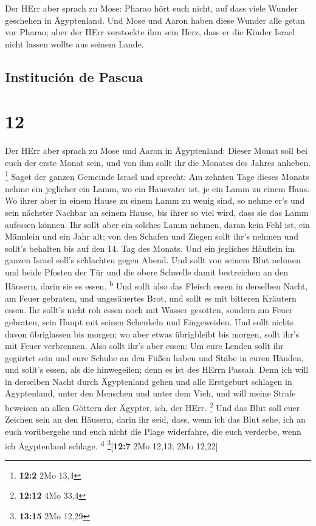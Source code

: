  Der HErr aber sprach zu Mose: Pharao hört euch nicht, auf
dass viele Wunder geschehen in Ägyptenland.  Und Mose und
Aaron haben diese Wunder alle getan vor Pharao; aber der HErr verstockte
ihm sein Herz, dass er die Kinder Israel nicht lassen wollte aus seinem
Lande.

\hypertarget{instituciuxf3n-de-pascua}{%
\subsection{Institución de Pascua}\label{instituciuxf3n-de-pascua}}

\hypertarget{section-11}{%
\section{12}\label{section-11}}

 Der HErr aber sprach zu Mose und Aaron in Ägyptenland:
 Dieser Monat soll bei euch der erste Monat sein, und von
ihm sollt ihr die Monates des Jahres anheben. \footnote{\textbf{12:2}
  2Mo 13,4}  Saget der ganzen Gemeinde Israel und sprecht:
Am zehnten Tage dieses Monats nehme ein jeglicher ein Lamm, wo ein
Hausvater ist, je ein Lamm zu einem Haus.  Wo ihrer aber
in einem Hause zu einem Lamm zu wenig sind, so nehme er's und sein
nächster Nachbar an seinem Hause, bis ihrer so viel wird, dass sie das
Lamm aufessen können.  Ihr sollt aber ein solches Lamm
nehmen, daran kein Fehl ist, ein Männlein und ein Jahr alt; von den
Schafen und Ziegen sollt ihr's nehmen  und sollt's
behalten bis auf den 14. Tag des Monats. Und ein jegliches Häuflein im
ganzen Israel soll's schlachten gegen Abend.  Und sollt
von seinem Blut nehmen und beide Pfosten der Tür und die obere Schwelle
damit bestreichen an den Häusern, darin sie es essen.
\textsuperscript{b}  Und sollt also das Fleisch essen in
derselben Nacht, am Feuer gebraten, und ungesäuertes Brot, und sollt es
mit bitteren Kräutern essen.  Ihr sollt's nicht roh essen
noch mit Wasser gesotten, sondern am Feuer gebraten, sein Haupt mit
seinen Schenkeln und Eingeweiden.  Und sollt nichts davon
übriglassen bis morgen; wo aber etwas übrigbleibt bis morgen, sollt
ihr's mit Feuer verbrennen.  Also sollt ihr's aber essen:
Um eure Lenden sollt ihr gegürtet sein und eure Schuhe an den Füßen
haben und Stäbe in euren Händen, und sollt's essen, als die hinwegeilen;
denn es ist des HErrn Passah.  Denn ich will in derselben
Nacht durch Ägyptenland gehen und alle Erstgeburt schlagen in
Ägyptenland, unter den Menschen und unter dem Vieh, und will meine
Strafe beweisen an allen Göttern der Ägypter, ich, der HErr. \footnote{\textbf{12:12}
  4Mo 33,4}  Und das Blut soll euer Zeichen sein an den
Häusern, darin ihr seid, dass, wenn ich das Blut sehe, ich an euch
vorübergehe und euch nicht die Plage widerfahre, die euch verderbe, wenn
ich Ägyptenland schlage. \textsuperscript{d} \footnote{\textbf{13:15}
  2Mo 12,29}{[}\textbf{12:7} 2Mo 12,13; 2Mo 12,22{]}

